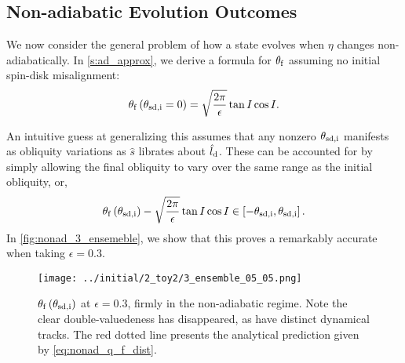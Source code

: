 \documentclass[
        fleqn,
        usenatbib,
        referee,
    ]{mnras}
\newcommand*{\p}[1]{\left(#1\right)}
\newcommand*{\s}[1]{\left[#1\right]}
\begin{document}
\subsection{Non-adiabatic Evolution Outcomes}

We now consider the general problem of how a state evolves when $\eta$ changes
non-adiabatically. In \autoref{s:ad_approx}, we derive a formula for
$\theta_{\rm f}$ assuming no initial spin-disk misalignment:
\begin{equation}
    \theta_{\rm f}\p{\theta_{\rm sd, i} = 0} = \sqrt{\frac{2\pi}{\epsilon}} \tan
        I\cos I.\label{eq:nonad_q_f}
\end{equation}

An intuitive guess at generalizing this assumes that any nonzero $\theta_{\rm
sd, i}$ manifests as obliquity variations as $\hat{s}$ librates about
$\hat{l}_{\rm d}$. These can be accounted for by simply allowing the final
obliquity to vary over the same range as the initial obliquity, or,
\begin{equation}
    \theta_{\rm f}\p{\theta_{\rm sd, i}} - \sqrt{\frac{2\pi}{\epsilon}} \tan
        I\cos I\in \s{-\theta_{\rm sd, i}, \theta_{\rm sd,i}}
        .\label{eq:nonad_q_f_dist}
\end{equation}
In \autoref{fig:nonad_3_ensemeble}, we show that this proves a remarkably
accurate when taking $\epsilon = 0.3$.
\begin{figure}
    \centering
    \texttt{[image: ../initial/2\_toy2/3\_ensemble\_05\_05.png]}
    \caption{$\theta_{\rm  f}\p{\theta_{\rm sd, i}}$ at $\epsilon = 0.3$, firmly
    in the non-adiabatic regime. Note the clear double-valuedeness has
    disappeared, as have distinct dynamical tracks. The red dotted line presents
    the analytical prediction given by
    \autoref{eq:nonad_q_f_dist}.}\label{fig:nonad_3_ensemeble}
\end{figure}
\end{document}
